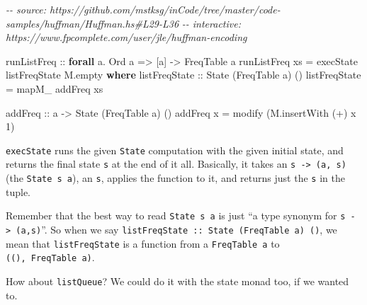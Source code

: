 \documentclass[]{article}
\newenvironment{Shaded}{}{}
\newcommand{\CommentTok}[1]{\textcolor[rgb]{0.38,0.63,0.69}{\textit{#1}}}
\newcommand{\DataTypeTok}[1]{\textcolor[rgb]{0.56,0.13,0.00}{#1}}
\newcommand{\DecValTok}[1]{\textcolor[rgb]{0.25,0.63,0.44}{#1}}
\newcommand{\FunctionTok}[1]{\textcolor[rgb]{0.02,0.16,0.49}{#1}}
\newcommand{\KeywordTok}[1]{\textcolor[rgb]{0.00,0.44,0.13}{\textbf{#1}}}
\newcommand{\NormalTok}[1]{#1}
\newcommand{\OperatorTok}[1]{\textcolor[rgb]{0.40,0.40,0.40}{#1}}
\newcommand{\OtherTok}[1]{\textcolor[rgb]{0.00,0.44,0.13}{#1}}
\begin{document}
\begin{Shaded}
\begin{Highlighting}[]
\CommentTok{{-}{-} source: https://github.com/mstksg/inCode/tree/master/code{-}samples/huffman/Huffman.hs\#L29{-}L36}
\CommentTok{{-}{-} interactive: https://www.fpcomplete.com/user/jle/huffman{-}encoding}

\OtherTok{runListFreq ::} \KeywordTok{forall}\NormalTok{ a}\OperatorTok{.} \DataTypeTok{Ord}\NormalTok{ a }\OtherTok{=>}\NormalTok{ [a] }\OtherTok{{-}>} \DataTypeTok{FreqTable}\NormalTok{ a}
\NormalTok{runListFreq xs }\OtherTok{=}\NormalTok{ execState listFreqState M.empty}
  \KeywordTok{where}
\OtherTok{    listFreqState ::} \DataTypeTok{State}\NormalTok{ (}\DataTypeTok{FreqTable}\NormalTok{ a) ()}
\NormalTok{    listFreqState }\OtherTok{=} \FunctionTok{mapM\_}\NormalTok{ addFreq xs}

\OtherTok{    addFreq ::}\NormalTok{ a }\OtherTok{{-}>} \DataTypeTok{State}\NormalTok{ (}\DataTypeTok{FreqTable}\NormalTok{ a) ()}
\NormalTok{    addFreq x }\OtherTok{=}\NormalTok{ modify (M.insertWith (}\OperatorTok{+}\NormalTok{) x }\DecValTok{1}\NormalTok{)}
\end{Highlighting}
\end{Shaded}

\texttt{execState} runs the given \texttt{State} computation with the given
initial state, and returns the final state \texttt{s} at the end of it all.
Basically, it takes an \texttt{s\ -\textgreater{}\ (a,\ s)} (the
\texttt{State\ s\ a}), an \texttt{s}, applies the function to it, and returns
just the \texttt{s} in the tuple.

Remember that the best way to read \texttt{State\ s\ a} is just ``a type synonym
for \texttt{s\ -\textgreater{}\ (a,s)}''. So when we say
\texttt{listFreqState\ ::\ State\ (FreqTable\ a)\ ()}, we mean that
\texttt{listFreqState} is a function from a \texttt{FreqTable\ a} to
\texttt{((),\ FreqTable\ a)}.

How about \texttt{listQueue}? We could do it with the state monad too, if we
wanted to.
\end{document}
